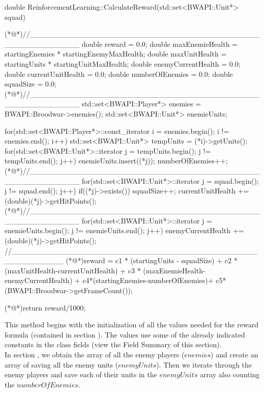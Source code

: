 \begin{Sourcecode}[caption=CalculateReward Method]
double ReinforcementLearning::CalculateReward(std::set<BWAPI::Unit*> squad)
{
(*@\lnote@*)//_________________________________________________________	
	double reward = 0.0;
	double maxEnemieHealth = startingEnemies * startingEnemyMaxHealth;
	double maxUnitHealth = startingUnits * startingUnitMaxHealth;
	double enemyCurrentHealth = 0.0;
	double currentUnitHealth = 0.0;
	double numberOfEnemies = 0.0;
	double squadSize = 0.0;
(*@\lnote@*)//_________________________________________________________
	std::set<BWAPI::Player*> enemies = BWAPI::Broodwar->enemies();	
	std::set<BWAPI::Unit*> enemieUnits;

	for(std::set<BWAPI::Player*>::const_iterator i = enemies.begin(); i != enemies.end(); i++)
	{
		std::set<BWAPI::Unit*> tempUnits = (*i)->getUnits();
		for(std::set<BWAPI::Unit*>::iterator j = tempUnits.begin(); j != tempUnits.end(); j++)
		{
			enemieUnits.insert((*j));
			numberOfEnemies++;
		}
	}
(*@\lnote@*)//_________________________________________________________
	for(std::set<BWAPI::Unit*>::iterator j = squad.begin(); j != squad.end(); j++)
	{
		if((*j)->exists()) squadSize++;
		currentUnitHealth += (double)(*j)->getHitPoints();
	}
(*@\lnote@*)//_________________________________________________________
	for(std::set<BWAPI::Unit*>::iterator j = enemieUnits.begin(); j != enemieUnits.end(); j++)
	{
		enemyCurrentHealth += (double)(*j)->getHitPoints();
	}	
//_________________________________________________________
	(*@\lnote@*)reward = c1 * (startingUnits - squadSize) + c2 * (maxUnitHealth-currentUnitHealth) + c3 * (maxEnemieHealth-enemyCurrentHealth) + c4*(startingEnemies-numberOfEnemies)+ c5*(BWAPI::Broodwar->getFrameCount());
	
	(*@\lnote@*)return reward/1000;
}
\end{Sourcecode}
This method begins with the initialization of all the values needed for the reward formula (contained in section ). The values use some of the already indicated constants in the class fields (view the Field Summary of this section). \\

In section , we obtain the array of all the enemy players ($enemies$) and create an array of saving all the enemy units ($enemyUnits$). Then we iterate through the enemy players and save each of their units in the $enemyUnits$ array also counting the $numberOfEnemies$. \\

